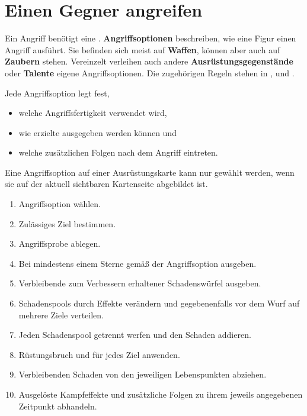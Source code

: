 \section{Einen Gegner angreifen}

Ein Angriff benötigt eine \standardAction. \textbf{Angriffsoptionen} beschreiben, wie eine Figur einen Angriff ausführt. Sie befinden sich meist auf \textbf{Waffen}, können aber auch auf \textbf{Zaubern} stehen. Vereinzelt verleihen auch andere \textbf{Ausrüstungsgegenstände} oder \textbf{Talente} eigene Angriffsoptionen. Die zugehörigen Regeln stehen in ,  und .

Jede Angriffsoption legt fest,

\begin{itemize}
  \item welche Angriffsfertigkeit verwendet wird,
  \item wie erzielte \star{} ausgegeben werden können und
  \item welche zusätzlichen Folgen nach dem Angriff eintreten.
\end{itemize}

Eine Angriffsoption auf einer Ausrüstungskarte kann nur gewählt werden, wenn sie auf der aktuell sichtbaren Kartenseite abgebildet ist.

\begin{kurzregel}[title=Einen Angriff durchführen]
\begin{enumerate}
  \item Angriffsoption wählen.
  \item Zulässiges Ziel bestimmen.
  \item Angriffsprobe ablegen.
  \item Bei mindestens einem \star{} Sterne gemäß der Angriffsoption ausgeben.
  \item Verbleibende \star{} zum Verbessern erhaltener Schadenswürfel ausgeben.
  \item Schadenspools durch Effekte verändern und gegebenenfalls vor dem Wurf auf mehrere Ziele verteilen.
  \item Jeden Schadenspool getrennt werfen und den Schaden addieren.
  \item Rüstungsbruch und \armor{} für jedes Ziel anwenden.
  \item Verbleibenden Schaden von den jeweiligen Lebenspunkten abziehen.
  \item Ausgelöste Kampfeffekte und zusätzliche Folgen zu ihrem jeweils angegebenen Zeitpunkt abhandeln.
\end{enumerate}
\end{kurzregel}

